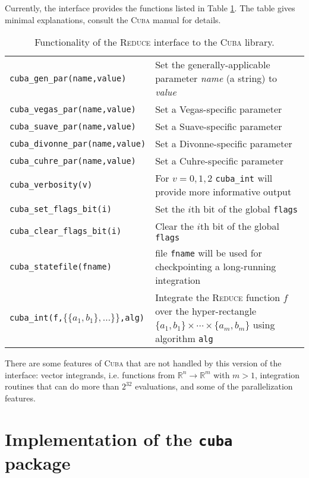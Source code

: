 \documentclass[11pt]{article}
\newcommand{\Reduce}{\textsc{Reduce}}
\newcommand{\Cuba}{\textsc{Cuba}}
\begin{document}
Currently, the interface provides the functions listed in Table \ref{tab:intf}.
The table gives minimal explanations, consult the {\Cuba} manual for details.
\begin{table}[h]
  \centering
  \begin{tabular}{|l|p{}|}\hline
    \texttt{cuba\_gen\_par(name,value)} & Set the generally-applicable parameter
      \emph{name} (a string) to \emph{value} \\
    \texttt{cuba\_vegas\_par(name,value)}  &   Set a Vegas-specific parameter \\
    \texttt{cuba\_suave\_par(name,value)}  &   Set a Suave-specific parameter \\
    \texttt{cuba\_divonne\_par(name,value)} &  Set a Divonne-specific parameter \\
    \texttt{cuba\_cuhre\_par(name,value)}   &  Set a Cuhre-specific parameter \\
    \hline
    \texttt{cuba\_verbosity(v)}  & For $v=0,1,2$ \texttt{cuba\_int} will provide
    more informative output \\
    \hline
    \texttt{cuba\_set\_flags\_bit(i)}      & Set the $i$th bit of the global
    \texttt{flags} \\
    \texttt{cuba\_clear\_flags\_bit(i)}    & Clear the $i$th bit of the global
    \texttt{flags} \\
    \texttt{cuba\_statefile(fname)} & file \texttt{fname} will be used for
    checkpointing a long-running integration \\
    \hline
    \texttt{cuba\_int(f,$\{\{a_1,b_1\},\dots\}\}$,alg)}    & Integrate
    the {\Reduce} function $f$ over the hyper-rectangle
    $\{a_1,b_1\}\times\cdots\times\{a_m,b_m\}$ using algorithm \texttt{alg} \\
      \hline
  \end{tabular}
  \caption{\label{tab:intf}Functionality of the {\Reduce} interface to the
    {\Cuba} library.}
\end{table}

There are some features of {\Cuba} that are not handled by this version of the
interface: vector integrands, i.e. functions from $\mathbb{R}^n\to\mathbb{R}^m$
with $m>1$, integration routines that can do more than $2^{32}$ evaluations, and
some of the parallelization features.
\clearpage



\section {Implementation of the \texttt{cuba} package}
\end{document}
